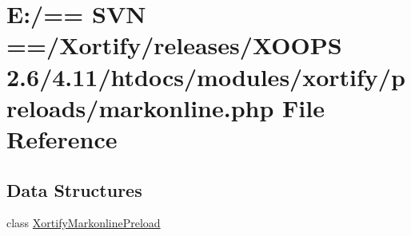 \hypertarget{markonline_8php}{\section{E\-:/== S\-V\-N ==/\-Xortify/releases/\-X\-O\-O\-P\-S 2.6/4.11/htdocs/modules/xortify/preloads/markonline.php File Reference}
\label{markonline_8php}
}
\subsection*{Data Structures}
\begin{DoxyCompactItemize}
\item 
class \hyperlink{class_xortify_markonline_preload}{Xortify\-Markonline\-Preload}
\end{DoxyCompactItemize}

